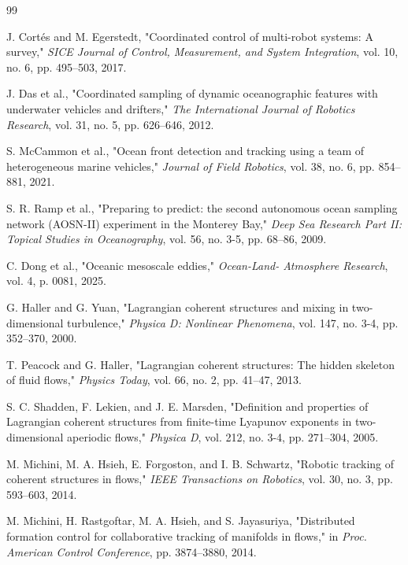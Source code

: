 \documentclass[lettersize,journal]{IEEEtran}
\begin{document}
\begin{thebibliography}{99}

 J. Cortés and M. Egerstedt, "Coordinated control of multi-robot
systems: A survey," \textit{SICE Journal of Control, Measurement, and
System Integration}, vol. 10, no. 6, pp. 495--503, 2017.

 J. Das et al., "Coordinated sampling of dynamic oceanographic
features with underwater vehicles and drifters," \textit{The International
Journal of Robotics Research}, vol. 31, no. 5, pp. 626--646, 2012.

 S. McCammon et al., "Ocean front detection and tracking using a
team of heterogeneous marine vehicles," \textit{Journal of Field Robotics},
vol. 38, no. 6, pp. 854--881, 2021.

 S. R. Ramp et al., "Preparing to predict: the second autonomous
ocean sampling network (AOSN-II) experiment in the Monterey Bay,"
\textit{Deep Sea Research Part II: Topical Studies in Oceanography}, vol. 56,
no. 3-5, pp. 68--86, 2009.

 C. Dong et al., "Oceanic mesoscale eddies," \textit{Ocean-Land-
Atmosphere Research}, vol. 4, p. 0081, 2025.

 G. Haller and G. Yuan, "Lagrangian coherent structures and mixing
in two-dimensional turbulence," \textit{Physica D: Nonlinear Phenomena},
vol. 147, no. 3-4, pp. 352--370, 2000.

 T. Peacock and G. Haller, "Lagrangian coherent structures: The
hidden skeleton of fluid flows," \textit{Physics Today}, vol. 66, no. 2,
pp. 41--47, 2013.

 S. C. Shadden, F. Lekien, and J. E. Marsden, "Definition and
properties of Lagrangian coherent structures from finite-time Lyapunov
exponents in two-dimensional aperiodic flows," \textit{Physica D}, vol. 212,
no. 3-4, pp. 271--304, 2005.

 M. Michini, M. A. Hsieh, E. Forgoston, and I. B. Schwartz,
"Robotic tracking of coherent structures in flows," \textit{IEEE Transactions
on Robotics}, vol. 30, no. 3, pp. 593--603, 2014.

 M. Michini, H. Rastgoftar, M. A. Hsieh, and S. Jayasuriya,
"Distributed formation control for collaborative tracking of manifolds in
flows," in \textit{Proc. American Control Conference}, pp. 3874--3880, 2014.


\end{thebibliography}
\end{document}
